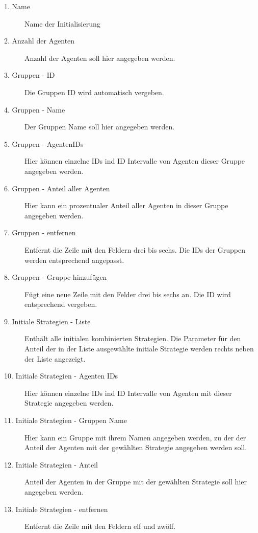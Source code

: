 \begin{description}


\item[1. Name] Name der Initialisierung

\item[2. Anzahl der Agenten] Anzahl der Agenten soll hier angegeben werden.

\item[3. Gruppen - ID] Die Gruppen ID wird automatisch vergeben.

\item[4. Gruppen - Name] Der Gruppen Name soll hier angegeben werden.

\item[5. Gruppen - AgentenIDs] Hier können einzelne IDs ind ID Intervalle von Agenten dieser Gruppe angegeben werden. 

\item[6. Gruppen - Anteil aller Agenten] Hier kann ein prozentualer Anteil aller Agenten in dieser Gruppe angegeben werden.

\item[7. Gruppen - entfernen] Entfernt die Zeile mit den Feldern drei bis sechs. Die IDs der Gruppen werden entsprechend angepasst. 

\item[8. Gruppen - Gruppe hinzufügen] Fügt eine neue Zeile mit den Felder drei bis sechs an. Die ID wird entsprechend vergeben.

\item[9. Initiale Strategien - Liste] Enthält alle initialen kombinierten Strategien. Die Parameter für den Anteil der in der Liste ausgewählte initiale Strategie werden rechts neben der Liste angezeigt. 

\item[10. Initiale Strategien - Agenten IDs] Hier können einzelne IDs ind ID Intervalle von Agenten mit dieser Strategie angegeben werden. 

\item[11. Initiale Strategien - Gruppen Name] Hier kann ein Gruppe mit ihrem Namen angegeben werden, zu der der Anteil der Agenten mit der gewählten Strategie angegeben werden soll.

\item[12. Initiale Strategien - Anteil] Anteil der Agenten in der Gruppe mit der gewählten Strategie soll hier angegeben werden.

\item[13. Initiale Strategien - entfernen] Entfernt die Zeile mit den Feldern elf und zwölf.


\end{description}
